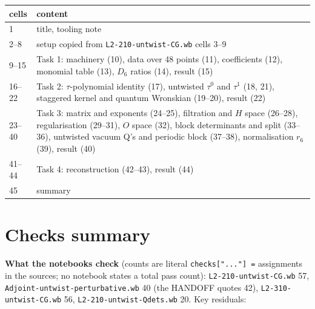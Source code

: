 \documentclass[10pt]{article}
\newcommand{\nb}[1]{\texttt{#1}}
\begin{document}
\begin{center}\small\setlength{\tabcolsep}{3pt}\begin{longtable}{@{}lp{11.5cm}@{}}\toprule
\textbf{cells} & \textbf{content} \\\midrule\endhead
1 & title, tooling note \\
2--8 & setup copied from \nb{L2-\allowbreak{}210-\allowbreak{}untwist-\allowbreak{}CG.\allowbreak{}wb} cells 3--9 \\
9--15 & Task 1: machinery (10), data over 48 points (11), coefficients (12), monomial table (13), $D_6$ ratios (14), result (15) \\
16--22 & Task 2: $\tau$-polynomial identity (17), untwisted $\tau^0$ and $\tau^1$ (18, 21), staggered kernel and quantum Wronskian (19--20), result (22) \\
23--40 & Task 3: matrix and exponents (24--25), filtration and $H$ space (26--28), regularisation (29--31), $O$ space (32), block determinants and split (33--36), untwisted vacuum Q's and periodic block (37--38), normalisation $r_6$ (39), result (40) \\
41--44 & Task 4: reconstruction (42--43), result (44) \\
45 & summary \\
\bottomrule\end{longtable}\end{center}

\section{Checks summary}\label{app:checks}

\textbf{What the notebooks check} (counts are literal \nb{checks[".\allowbreak{}.\allowbreak{}.\allowbreak{}"] =} assignments in the sources; no notebook states a total pass count): \nb{L2-\allowbreak{}210-\allowbreak{}untwist-\allowbreak{}CG.\allowbreak{}wb} 57, \nb{Adjoint-\allowbreak{}untwist-\allowbreak{}perturbative.\allowbreak{}wb} 40 (the HANDOFF quotes 42), \nb{L2-\allowbreak{}310-\allowbreak{}untwist-\allowbreak{}CG.\allowbreak{}wb} 56, \nb{L2-\allowbreak{}210-\allowbreak{}untwist-\allowbreak{}Qdets.\allowbreak{}wb} 20. Key residuals:
\end{document}

